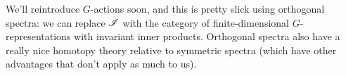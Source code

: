 We'll reintroduce $G$-actions soon, and this is pretty slick using orthogonal spectra: we can replace $\mathscr I$ with
the category of finite-dimensional $G$-representations with invariant inner products. Orthogonal spectra also have
a really nice homotopy theory relative to symmetric spectra (which have other advantages that don't apply as much
to us).
